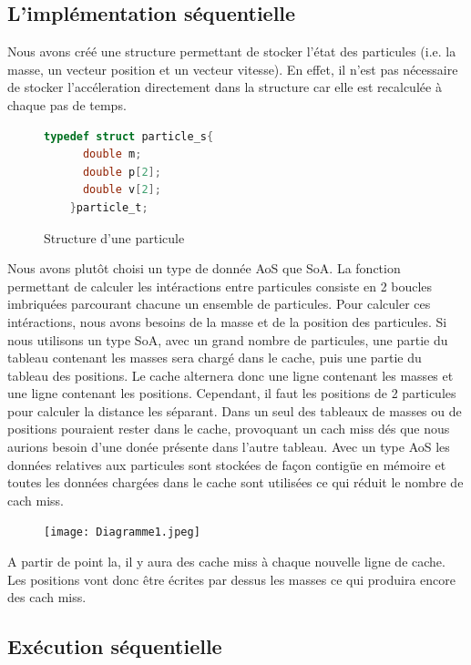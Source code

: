 \documentclass{article}
\begin{document}
\subsection{L'implémentation séquentielle}
Nous avons créé une structure permettant de stocker l'état des particules (i.e. la masse, un vecteur position et un vecteur vitesse). En effet, il n'est pas nécessaire de stocker l'accéleration directement dans la structure car elle est recalculée à chaque pas de temps.

\begin{figure}[h]
  \centering
  \begin{lstlisting}[language=C]
    typedef struct particle_s{
      double m;
      double p[2];
      double v[2];
    }particle_t;\end{lstlisting}
  \caption{Structure d'une particule}
\end{figure}

Nous avons plutôt choisi un type de donnée AoS que SoA.
La fonction permettant de calculer les intéractions entre particules consiste en 2 boucles imbriquées parcourant chacune un ensemble de particules. Pour calculer ces intéractions, nous avons besoins de la masse et de la position des particules. Si nous utilisons un type SoA, avec un grand nombre de particules, une partie du tableau contenant les masses sera chargé dans le cache, puis une partie du tableau des positions. Le cache alternera donc une ligne contenant les masses et une ligne contenant les positions. Cependant, il faut les positions de 2 particules pour calculer la distance les séparant. Dans 
un seul des tableaux de masses ou de positions pouraient rester dans le cache, provoquant un cach miss dés que nous aurions besoin d'une donée présente dans l'autre tableau. 
Avec un type AoS les données relatives aux particules sont stockées de façon contigüe en mémoire et toutes les données chargées dans le cache sont utilisées ce qui réduit le nombre de cach miss.


\begin{figure}[h]
  \centering
  \texttt{[image: Diagramme1.jpeg]}
  \caption{\label{fig:label} }
\end{figure}
A partir de point la, il y aura des cache miss à chaque nouvelle ligne de cache. Les positions vont donc être écrites par dessus les masses ce qui produira encore des cach miss.

\subsection{Exécution séquentielle}
\end{document}
